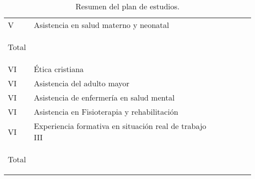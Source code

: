 \documentclass[9pt,a4paper]{article}
\begin{document}
\begin{table}[ht]
\begin{tabular}{|m{0.7cm}|m{7cm}|m{1.4cm}|m{1.4cm}|m{1.4cm}|m{1.4cm}|}
		{\parbox{1.4cm}{ }}      & 
		{\parbox{1.4cm}{}}      & 
		{\parbox{1.4cm}{ }}      & 
		{\parbox{1.4cm}{ }}     \\
		\hline
		{\parbox{0.7cm}{\centering V}}       & 
		Asistencia en salud materno y neonatal & 
		{\parbox{1.4cm}{ }}      & 
		{\parbox{1.4cm}{}}      & 
		{\parbox{1.4cm}{ }}      & 
		{\parbox{1.4cm}{ }}     \\
		\hline
		\rowcolor{azul}
		\textcolor{blanco}{\parbox{0.7cm}{\centering Total}}    & 
		                                                        & 
		\textcolor{blanco}{\parbox{1.4cm}{ }}      & 
		\textcolor{blanco}{\parbox{1.4cm}{ }}     & 
		\textcolor{blanco}{\parbox{1.4cm}{  }}    & 
		\textcolor{blanco}{\parbox{1.4cm}{ }}     \\	
		\hline
		{\parbox{0.7cm}{\centering VI}}      & 
		Ética cristiana                      & 
		{\parbox{1.4cm}{ }}      & 
		{\parbox{1.4cm}{}}      & 
		{\parbox{1.4cm}{ }}      & 
		{\parbox{1.4cm}{ }}     \\
		\hline
		{\parbox{0.7cm}{\centering VI}}      & 
		Asistencia del adulto mayor          & 
		{\parbox{1.4cm}{ }}      & 
		{\parbox{1.4cm}{}}      & 
		{\parbox{1.4cm}{ }}     & 
		{\parbox{1.4cm}{ }}    \\
		\hline
		{\parbox{0.7cm}{\centering VI}}       & 
		Asistencia de enfermería en salud mental & 
		{\parbox{1.4cm}{ }}      & 
		{\parbox{1.4cm}{}}      & 
		{\parbox{1.4cm}{ }}     & 
		{\parbox{1.4cm}{ }}     \\
		\hline
		{\parbox{0.7cm}{\centering VI}}       & 
		Asistencia en Fisioterapia y rehabilitación & 
		{\parbox{1.4cm}{ }}      & 
		{\parbox{1.4cm}{}}      & 
		{\parbox{1.4cm}{ }}      & 
		{\parbox{1.4cm}{ }}     \\
		\hline
		{\parbox{0.7cm}{\centering VI}}       & 
		Experiencia formativa en situación real de trabajo III & 
		{\parbox{1.4cm}{ }}      & 
		{\parbox{1.4cm}{ }}      & 
		{\parbox{1.4cm}{ }}      & 
		{\parbox{1.4cm}{ }}     \\
		\hline
		\rowcolor{azul}
		\textcolor{blanco}{\parbox{0.7cm}{\centering Total}}    & 
		                                                        & 
		\textcolor{blanco}{\parbox{1.4cm}{ }}      & 
		\textcolor{blanco}{\parbox{1.4cm}{ }}     & 
		\textcolor{blanco}{\parbox{1.4cm}{  }}    & 
		\textcolor{blanco}{\parbox{1.4cm}{ }}     \\	
		\hline
	\end{tabular}
	\caption{Resumen del plan de estudios.}
  \end{table}
\end{document}
